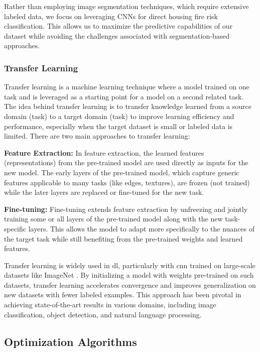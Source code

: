 Rather than employing image segmentation techniques, which require extensive labeled data, we focus 
on leveraging CNNs for direct housing fire risk classification. This allows us to maximize the predictive 
capabilities of our dataset while avoiding the challenges associated with segmentation-based approaches.


\subsubsection{Transfer Learning}

Transfer learning is a machine learning technique where a model trained on one task and
is leveraged as a starting point for a model on a second related task. The idea behind transfer
learning is to transfer knowledge learned from a source domain (task) to a target domain (task)
to improve learning efficiency and performance, especially when the target dataset is small or
labeled data is limited. There are two main approaches to transfer learning:

\textbf{Feature Extraction:} In feature extraction, the learned features (representations)
from the pre-trained model are used directly as inputs for the new model. The early layers of
the pre-trained model, which capture generic features applicable to many tasks (like edges, textures),
are frozen (not trained) while the later layers are replaced or fine-tuned for the new task.

\textbf{Fine-tuning:} Fine-tuning extends feature extraction by unfreezing and jointly training
some or all layers of the pre-trained model along with the new task-specific layers. This allows
the model to adapt more specifically to the nuances of the target task while still benefiting from
the pre-trained weights and learned features.

Transfer learning is widely used in \gls{dl}, particularly with \gls{cnn}
trained on large-scale datasets like ImageNet \cite{deng2009imagenet}. By initializing a model with
weights pre-trained on such datasets, transfer learning accelerates convergence and improves
generalization on new datasets with fewer labeled examples. This approach has been pivotal in
achieving state-of-the-art results in various domains, including image classification, object
detection, and natural language processing.



\subsection{Optimization Algorithms}

